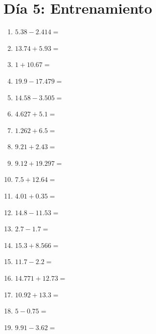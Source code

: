 \documentclass[12pt]{article}
\begin{document}
\section*{Día 5: Entrenamiento}
\begin{enumerate}
\item \large $ 5.38 - 2.414 = $ \vspace{1.5cm}
\item \large $ 13.74 + 5.93 = $ \vspace{1.5cm}
\item \large $ 1 + 10.67 = $ \vspace{1.5cm}
\item \large $ 19.9 - 17.479 = $ \vspace{1.5cm}
\item \large $ 14.58 - 3.505 = $ \vspace{1.5cm}
\item \large $ 4.627 + 5.1 = $ \vspace{1.5cm}
\item \large $ 1.262 + 6.5 = $ \vspace{1.5cm}
\item \large $ 9.21 + 2.43 = $ \vspace{1.5cm}
\item \large $ 9.12 + 19.297 = $ \vspace{1.5cm}
\item \large $ 7.5 + 12.64 = $ \vspace{1.5cm}
\newpage
\item \large $ 4.01 + 0.35 = $ \vspace{1.5cm}
\item \large $ 14.8 - 11.53 = $ \vspace{1.5cm}
\item \large $ 2.7 - 1.7 = $ \vspace{1.5cm}
\item \large $ 15.3 + 8.566 = $ \vspace{1.5cm}
\item \large $ 11.7 - 2.2 = $ \vspace{1.5cm}
\item \large $ 14.771 + 12.73 = $ \vspace{1.5cm}
\item \large $ 10.92 + 13.3 = $ \vspace{1.5cm}
\item \large $ 5 - 0.75 = $ \vspace{1.5cm}
\item \large $ 9.91 - 3.62 = $ \vspace{1.5cm}

\end{enumerate}
\end{document}
